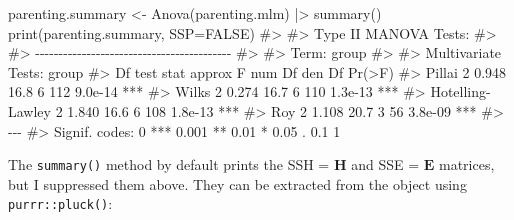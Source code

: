 \documentclass[
  letterpaper,
  10pt,
  krantz2]{krantz}
\makeatletter
\newenvironment{Shaded}{\begin{snugshade}}{\end{snugshade}}
\newcommand{\AttributeTok}[1]{\textcolor[rgb]{0.40,0.45,0.13}{#1}}
\newcommand{\CommentTok}[1]{\textcolor[rgb]{0.37,0.37,0.37}{#1}}
\newcommand{\ConstantTok}[1]{\textcolor[rgb]{0.56,0.35,0.01}{#1}}
\newcommand{\FunctionTok}[1]{\textcolor[rgb]{0.28,0.35,0.67}{#1}}
\newcommand{\NormalTok}[1]{\textcolor[rgb]{0.00,0.23,0.31}{#1}}
\newcommand{\OtherTok}[1]{\textcolor[rgb]{0.00,0.23,0.31}{#1}}
\newcommand{\SpecialCharTok}[1]{\textcolor[rgb]{0.37,0.37,0.37}{#1}}
\newenvironment{kframe}{%
  \medskip{}
  \setlength{\fboxsep}{.8em}
  \def\at@end@of@kframe{}%
  \ifinner\ifhmode%
  \def\at@end@of@kframe{\end{minipage}}%
  \begin{minipage}{\columnwidth}%
  \fi\fi%
  \def\FrameCommand##1{\hskip\@totalleftmargin \hskip-\fboxsep
  \colorbox{shadecolor}{##1}\hskip-\fboxsep
      \hskip-\linewidth \hskip-\@totalleftmargin \hskip\columnwidth}%
  \MakeFramed {\advance\hsize-\width
    \@totalleftmargin\z@ \linewidth\hsize
    \@setminipage}}%
{\par\unskip\endMakeFramed%
  \at@end@of@kframe}
\renewenvironment{Shaded}{\begin{kframe}}{\end{kframe}}
\makeatother
\begin{document}
\begin{Shaded}
\begin{Highlighting}[]
\NormalTok{parenting.summary }\OtherTok{\textless{}{-}} \FunctionTok{Anova}\NormalTok{(parenting.mlm) }\SpecialCharTok{|\textgreater{}}  \FunctionTok{summary}\NormalTok{() }
\FunctionTok{print}\NormalTok{(parenting.summary, }\AttributeTok{SSP=}\ConstantTok{FALSE}\NormalTok{)}
\CommentTok{\#\textgreater{} }
\CommentTok{\#\textgreater{} Type II MANOVA Tests:}
\CommentTok{\#\textgreater{} }
\CommentTok{\#\textgreater{} {-}{-}{-}{-}{-}{-}{-}{-}{-}{-}{-}{-}{-}{-}{-}{-}{-}{-}{-}{-}{-}{-}{-}{-}{-}{-}{-}{-}{-}{-}{-}{-}{-}{-}{-}{-}{-}{-}{-}{-}{-}{-}}
\CommentTok{\#\textgreater{}  }
\CommentTok{\#\textgreater{} Term: group }
\CommentTok{\#\textgreater{} }
\CommentTok{\#\textgreater{} Multivariate Tests: group}
\CommentTok{\#\textgreater{}                  Df test stat approx F num Df den Df  Pr(\textgreater{}F)    }
\CommentTok{\#\textgreater{} Pillai            2     0.948     16.8      6    112 9.0e{-}14 ***}
\CommentTok{\#\textgreater{} Wilks             2     0.274     16.7      6    110 1.3e{-}13 ***}
\CommentTok{\#\textgreater{} Hotelling{-}Lawley  2     1.840     16.6      6    108 1.8e{-}13 ***}
\CommentTok{\#\textgreater{} Roy               2     1.108     20.7      3     56 3.8e{-}09 ***}
\CommentTok{\#\textgreater{} {-}{-}{-}}
\CommentTok{\#\textgreater{} Signif. codes:  0 \textquotesingle{}***\textquotesingle{} 0.001 \textquotesingle{}**\textquotesingle{} 0.01 \textquotesingle{}*\textquotesingle{} 0.05 \textquotesingle{}.\textquotesingle{} 0.1 \textquotesingle{} \textquotesingle{} 1}
\end{Highlighting}
\end{Shaded}

The \texttt{summary()} method by default prints the SSH = \(\mathbf{H}\)
and SSE = \(\mathbf{E}\) matrices, but I suppressed them above. They can
be extracted from the object using \texttt{purrr::pluck()}:
\end{document}
